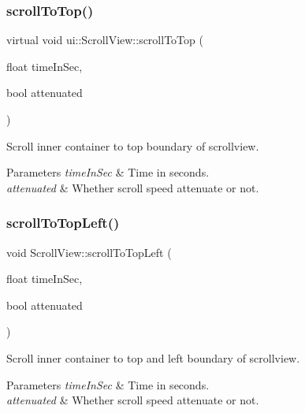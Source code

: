 \subsubsection{\texorpdfstring{scroll\+To\+Top()}{scrollToTop()}\hspace{0.1cm}{\footnotesize\ttfamily [2/2]}}
{\footnotesize\ttfamily virtual void ui\+::\+Scroll\+View\+::scroll\+To\+Top (\begin{DoxyParamCaption}\item[{float}]{time\+In\+Sec,  }\item[{bool}]{attenuated }\end{DoxyParamCaption})\hspace{0.3cm}{\ttfamily [virtual]}}

Scroll inner container to top boundary of scrollview. 
\begin{DoxyParams}{Parameters}
{\em time\+In\+Sec} & Time in seconds. \\
\hline
{\em attenuated} & Whether scroll speed attenuate or not. \\
\hline
\end{DoxyParams}
\mbox{\label{classui_1_1ScrollView_a818acfca4fe216bc428c20674b6cf916}} 
\subsubsection{\texorpdfstring{scroll\+To\+Top\+Left()}{scrollToTopLeft()}\hspace{0.1cm}{\footnotesize\ttfamily [1/2]}}
{\footnotesize\ttfamily void Scroll\+View\+::scroll\+To\+Top\+Left (\begin{DoxyParamCaption}\item[{float}]{time\+In\+Sec,  }\item[{bool}]{attenuated }\end{DoxyParamCaption})\hspace{0.3cm}{\ttfamily [virtual]}}

Scroll inner container to top and left boundary of scrollview. 
\begin{DoxyParams}{Parameters}
{\em time\+In\+Sec} & Time in seconds. \\
\hline
{\em attenuated} & Whether scroll speed attenuate or not. \\
\hline
\end{DoxyParams}
\mbox{\label{classui_1_1ScrollView_a2a34bb5914f99b9d9088376744148407}} 
